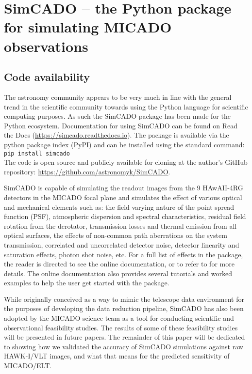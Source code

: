 \section{SimCADO -- the Python package for simulating MICADO observations}
\label{sec:scope}


\subsection{Code availability}


The astronomy community appears to be very much in line with the general trend in the scientific community towards using the Python language for scientific computing purposes. As such the SimCADO package has been made for the Python ecosystem. Documentation for using SimCADO can be found on Read the Docs (\url{https://simcado.readthedocs.io}). The package is available via the python package index (PyPI) and can be installed using the standard command:\\

\verb+pip install simcado+\\

The code is open source and publicly available for cloning at the author's GitHub repository: \url{https://github.com/astronomyk/SimCADO}. 

SimCADO is capable of simulating the readout images from the 9 HAwAII-4RG detectors in the MICADO focal plane and simulates the effect of various optical and mechanical elements such as: the field varying nature of the point spread function (PSF), atmospheric dispersion and spectral characteristics, residual field rotation from the derotator, transmission losses and thermal emission from all optical surfaces, the effects of non-common path aberrations on the system transmission, correlated and uncorrelated detector noise, detector linearity and saturation effects, photon shot noise, etc. For a full list of effects in the package, the reader is directed to see the online documentation, or to refer to \citet{leschinski2016} for more details. The online documentation also provides several tutorials and worked examples to help the user get started with the package.

While originally conceived as a way to mimic the telescope data environment for the purposes of developing the data reduction pipeline, SimCADO has also been adopted by the MICADO science team as a tool for conducting scientific and observational feasibility studies. The results of some of these feasibility studies will be presented in future papers. The remainder of this paper will be dedicated to showing how we validated the accuracy of SimCADO simulations against raw HAWK-I/VLT images, and what that means for the predicted sensitivity of MICADO/ELT.


